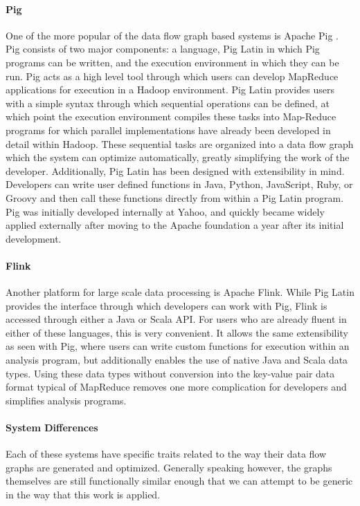 \paragraph{Pig}
One of the more popular of the data flow graph based systems is Apache Pig \cite{Gates2009}. Pig consists of two major components: a language, Pig Latin \cite{Olston2008a} in which Pig programs can be written, and the execution environment in which they can be run. Pig acts as a high level tool through which users can develop MapReduce applications for execution in a Hadoop environment. Pig Latin provides users with a simple syntax through which sequential operations can be defined, at which point the execution environment compiles these tasks into Map-Reduce programs for which parallel implementations have already been developed in detail within Hadoop. These sequential tasks are organized into a data flow graph which the system can optimize automatically, greatly simplifying the work of the developer. Additionally, Pig Latin has been designed with extensibility in mind. Developers can write user defined functions in Java, Python, JavaScript, Ruby, or Groovy and then call these functions directly from within a Pig Latin program. Pig was initially developed internally at Yahoo, and quickly became widely applied externally after moving to the Apache foundation a year after its initial development. 

\paragraph{Flink}
Another platform for large scale data processing is Apache Flink. While Pig Latin provides the interface through which developers can work with Pig, Flink is accessed through either a Java or Scala API. For users who are already fluent in either of these languages, this is very convenient. It allows the same extensibility as seen with Pig, where users can write custom functions for execution within an analysis program, but additionally enables the use of native Java and Scala data types. Using these data types without conversion into the key-value pair data format typical of MapReduce removes one more complication for developers and simplifies analysis programs. 

\paragraph{System Differences}
Each of these systems have specific traits related to the way their data flow graphs are generated and optimized. Generally speaking however, the graphs themselves are still functionally similar enough that we can attempt to be generic in the way that this work is applied. 

